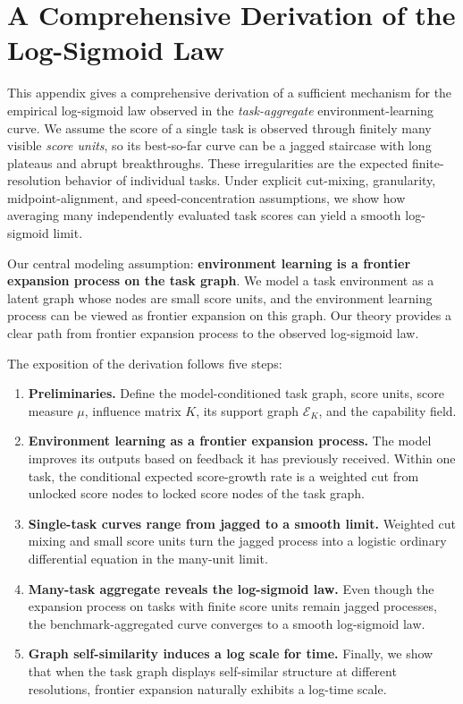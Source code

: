 
\section{A Comprehensive Derivation of the Log-Sigmoid Law}
\label{sec:theory}

This appendix gives a comprehensive derivation of a sufficient mechanism for the empirical log-sigmoid law observed in the \emph{task-aggregate} environment-learning curve. We assume the score of a single task is observed through finitely many visible \emph{score units}, so its best-so-far curve can be a jagged staircase with long plateaus and abrupt breakthroughs. These irregularities are the expected finite-resolution behavior of individual tasks. Under explicit cut-mixing, granularity, midpoint-alignment, and speed-concentration assumptions, we show how averaging many independently evaluated task scores can yield a smooth log-sigmoid limit.


Our central modeling assumption: \textbf{environment learning is a frontier expansion process on the task graph}. We model a task environment as a latent graph whose nodes are small score units, and the environment learning process can be viewed as frontier expansion on this graph. Our theory provides a clear path from frontier expansion process to the observed log-sigmoid law.

The exposition of the derivation follows five steps:
\begin{enumerate}[label=\textbf{\arabic*.},leftmargin=2.1em,itemsep=0.15em,topsep=0.25em]
    \item \textbf{Preliminaries.} Define the model-conditioned task graph, score units, score measure $\mu$, influence matrix $K$, its support graph $\mathcal E_K$, and the capability field.
    \item \textbf{Environment learning as a frontier expansion process.} The model improves its outputs based on feedback it has previously received. Within one task, the conditional expected score-growth rate is a weighted cut from unlocked score nodes to locked score nodes of the task graph.
    \item \textbf{Single-task curves range from jagged to a smooth limit.} Weighted cut mixing and small score units turn the jagged process into a logistic ordinary differential equation in the many-unit limit.
    \item \textbf{Many-task aggregate reveals the log-sigmoid law.} Even though the expansion process on tasks with finite score units remain jagged processes, the benchmark-aggregated curve converges to a smooth log-sigmoid law.
    \item \textbf{Graph self-similarity induces a log scale for time.} Finally, we show that when the task graph displays self-similar structure at different resolutions, frontier expansion naturally exhibits a log-time scale.
\end{enumerate}

